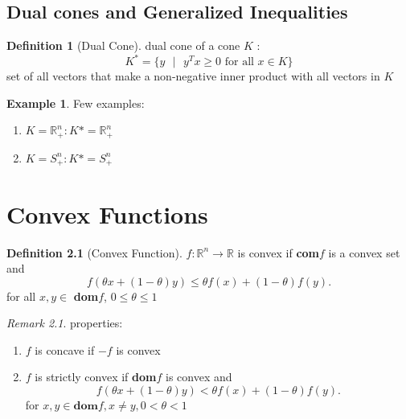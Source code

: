 \documentclass{report}
\theoremstyle{remark} \newtheorem{remark}{Remark}[section]
\theoremstyle{definition}
\newtheorem{definition}{Definition}[section]
\theoremstyle{definition}
\newtheorem{example}{Example}[section]
\theoremstyle{definition}
\theoremstyle{remark}
\begin{document}
\section{Dual cones and Generalized Inequalities}

\begin{definition}[Dual Cone]
    dual cone of a cone $K$ :
    \[
    K^{*} = \{y \text{ }|\text{ }y^{T}x\ge 0 \text{ for all }x\in K\}
    \] 
set of all vectors that make a non-negative inner product with all vectors in $K$       
\end{definition}

\begin{example}
Few examples:
    \begin{enumerate}
        \item $K = \mathbb{R}_+^{n}: K*=\mathbb{R}_+^{n}$
             \item $K=S_+^{n}: K*=S_+^{n}$
    \end{enumerate} 
\end{example}


\chapter{Convex Functions}

\begin{definition}[Convex Function]
    $f: \mathbb{R}^{n}\to \mathbb{R}$ is convex if \textbf{com}$f$ is a convex set and
    \[
    f(\theta x+(1-\theta)y) \le  \theta f(x) + (1-\theta)f(y)
    .\] 
      for all $x,y\in$ \textbf{dom}$f$, $0\le \theta \le 1$
\end{definition}
\begin{remark}
    properties:
    \begin{enumerate}
        \item $f$ is concave if $-f$ is convex
            \item $f$ is strictly convex if \textbf{dom}$f$ is convex and
                \[
               f(\theta x+(1-\theta)y)<\theta f(x) + (1-\theta)f(y)
                .\] 
       for $x,y\in \textbf{dom}f, x\neq y, 0<\theta<1$ 
    \end{enumerate}
\end{remark}
\end{document}
